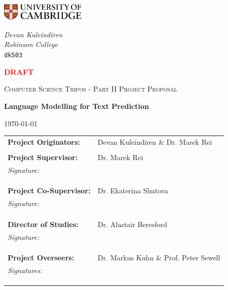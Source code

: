 \documentclass[a4paper, 12pt]{article}
\begin{document}
\begin{titlepage}
	\noindent
	\begin{minipage}[t][][t]{0.5\textwidth}
		\includegraphics[width=40mm]{./Images/CamLogo.jpg}
	\end{minipage}
	\begin{minipage}{0.5\textwidth}
	\begin{flushright}
		\large
		\textit{Devan Kuleindiren}
		\\
		\textit{Robinson College}
		\\
		\texttt{dk503}
	\end{flushright}
	\end{minipage}
	
	\begin{center}
	\vspace{3cm}
	{\scshape\huge \textbf{\textcolor{red}{DRAFT}}\par}
	\vspace{2cm}
	{\scshape\large Computer Science Tripos - Part II Project Proposal\par}
	\vspace{0.5cm}
	{\huge\bfseries Language Modelling for Text Prediction\par}
	\vspace{0.5cm}
	{\large \today \par}
	\end{center}
	
	\vfill
	
	\begin{tabular}{ll}
	\textbf{Project Originators:} & Devan Kuleindiren \& Dr. Marek Rei \\ \\
	\textbf{Project Supervisor:} & Dr. Marek Rei \\
	\textit{Signature:} & \\ \\ \\ \\
	\textbf{Project Co-Supervisor:} & Dr. Ekaterina Shutova \\
	\textit{Signature:} & \\ \\ \\ \\
	\textbf{Director of Studies:} & Dr. Alastair Beresford \\
	\textit{Signature:} & \\ \\ \\ \\
	\textbf{Project Overseers:} & Dr. Markus Kuhn \& Prof. Peter Sewell \\
	\textit{Signatures:} & \\ \\ \\ \\
	\end{tabular}
	
	\vspace{1.5cm}
\end{titlepage}
\end{document}
